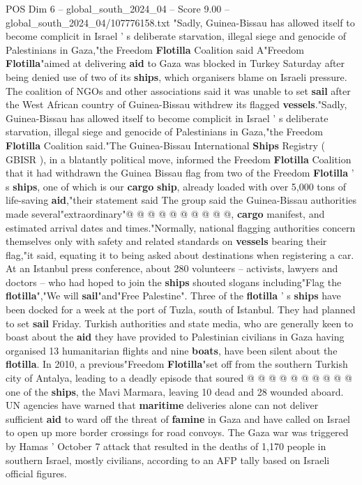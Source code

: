 \begin{textsample}{POS Dim 6 – global\_south\_2024\_04 – Score 9.00 – global\_south\_2024\_04/107776158.txt}  \label{ex:f6_pos_085}
"Sadly, Guinea-Bissau has allowed itself to become complicit in Israel ' s deliberate starvation, illegal siege and genocide of Palestinians in Gaza,"the Freedom \textbf{Flotilla} Coalition said A"Freedom \textbf{Flotilla}"aimed at delivering \textbf{aid} to Gaza was blocked in Turkey Saturday after being denied use of two of its \textbf{ships}, which organisers blame on Israeli pressure.
The coalition of NGOs and other associations said it was unable to set \textbf{sail} after the West African country of Guinea-Bissau withdrew its flagged \textbf{vessels}."Sadly, Guinea-Bissau has allowed itself to become complicit in Israel ' s deliberate starvation, illegal siege and genocide of Palestinians in Gaza,"the Freedom \textbf{Flotilla} Coalition said."The Guinea-Bissau International \textbf{Ships} Registry ( GBISR ), in a blatantly political move, informed the Freedom \textbf{Flotilla} Coalition that it had withdrawn the Guinea Bissau flag from two of the Freedom \textbf{Flotilla} ' s \textbf{ships}, one of which is our \textbf{cargo} \textbf{ship}, already loaded with over 5,000 tons of life-saving \textbf{aid},"their statement said The group said the Guinea-Bissau authorities made several"extraordinary"@ @ @ @ @ @ @ @ @ @, \textbf{cargo} manifest, and estimated arrival dates and times."Normally, national flagging authorities concern themselves only with safety and related standards on \textbf{vessels} bearing their flag,"it said, equating it to being asked about destinations when registering a car.
At an Istanbul press conference, about 280 volunteers -- activists, lawyers and doctors -- who had hoped to join the \textbf{ships} shouted slogans including"Flag the \textbf{flotilla}","We will \textbf{sail}"and"Free Palestine".
Three of the \textbf{flotilla} ' s \textbf{ships} have been docked for a week at the port of Tuzla, south of Istanbul.
They had planned to set \textbf{sail} Friday.
Turkish authorities and state media, who are generally keen to boast about the \textbf{aid} they have provided to Palestinian civilians in Gaza having organised 13 humanitarian flights and nine \textbf{boats}, have been silent about the \textbf{flotilla}.
In 2010, a previous"Freedom \textbf{Flotilla}"set off from the southern Turkish city of Antalya, leading to a deadly episode that soured @ @ @ @ @ @ @ @ @ @ one of the \textbf{ships}, the Mavi Marmara, leaving 10 dead and 28 wounded aboard.
UN agencies have warned that \textbf{maritime} deliveries alone can not deliver sufficient \textbf{aid} to ward off the threat of \textbf{famine} in Gaza and have called on Israel to open up more border crossings for road convoys.
The Gaza war was triggered by Hamas ' October 7 attack that resulted in the deaths of 1,170 people in southern Israel, mostly civilians, according to an AFP tally based on Israeli official figures.

\end{textsample}

